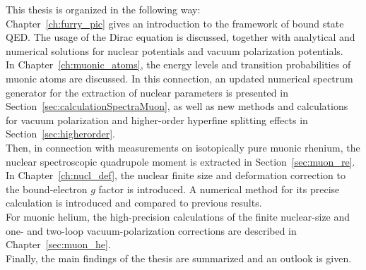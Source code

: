 This thesis is organized in the following way:\\
Chapter~\ref{ch:furry_pic} gives an introduction to the framework of bound state QED. The usage of the Dirac equation is discussed, together with analytical and numerical solutions for nuclear potentials and vacuum polarization potentials.\\
In Chapter~\ref{ch:muonic_atoms}, the energy levels and transition probabilities of muonic atoms are discussed. In this connection, an updated numerical spectrum generator for the extraction of nuclear parameters is presented in Section~\ref{sec:calculationSpectraMuon}, as well as new methods and calculations for vacuum polarization and higher-order hyperfine splitting effects in Section~\ref{sec:higherorder}. \\
Then, in connection with measurements on isotopically pure muonic rhenium, the nuclear spectroscopic quadrupole moment is extracted in Section~\ref{sec:muon_re}.\\
In Chapter~\ref{ch:nucl_def}, the nuclear finite size and deformation correction to the bound-electron $g$ factor is introduced. A numerical method for its precise calculation is introduced and compared to previous results.\\
For muonic helium, the high-precision calculations of the finite nuclear-size and one- and two-loop vacuum-polarization corrections are described in Chapter~\ref{sec:muon_he}.\\
Finally, the main findings of the thesis are summarized and an outlook is given.




































